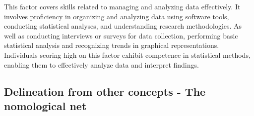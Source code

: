 \documentclass[
  12pt,
  a4paper,
  twoside]{article}
\begin{document}
This factor covers skills related to managing and analyzing data effectively. It involves proficiency in organizing and analyzing data using software tools, conducting statistical analyses, and understanding research methodologies.
As well as conducting interviews or surveys for data collection, performing basic statistical analysis and recognizing trends in graphical representations. Individuals scoring high on this factor exhibit competence in statistical methods, enabling them to effectively analyze data and interpret findings.

\subsection{Delineation from other concepts - The nomological net}\label{delineation-from-other-concepts---the-nomological-net}
\end{document}
